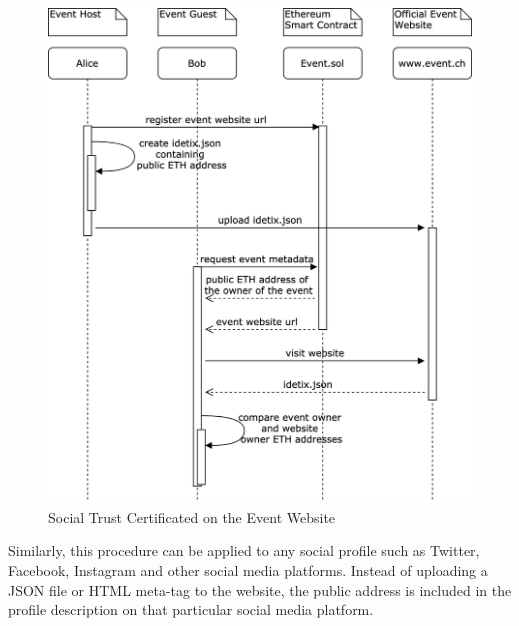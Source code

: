 \begin{figure}[H]
    \centering
    \includegraphics[width=14cm]{figures/social-trust-certificates.png}
    \caption{Social Trust Certificated on the Event Website}
    \label{fig:trust-certificate-event-website}
\end{figure}

Similarly, this procedure can be applied to any social profile such as Twitter, Facebook, Instagram and other social media platforms. Instead of uploading a JSON file or HTML meta-tag to the website, the public address is included in the profile description on that particular social media platform. 